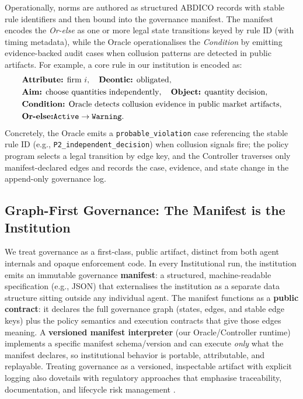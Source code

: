 \documentclass[11pt, a4paper]{article}
\begin{document}
Operationally, norms are authored as structured ABDICO records with stable rule identifiers and then bound into the governance manifest. The manifest encodes the \emph{Or-else} as one or more legal state transitions keyed by rule ID (with timing metadata), while the Oracle operationalises the \emph{Condition} by emitting evidence-backed audit cases when collusion patterns are detected in public artifacts.
For example, a core rule in our institution is encoded as:
\begin{align*}
&\text{\textbf{Attribute:} firm } i, \quad \text{\textbf{Deontic:} obligated}, \\
&\text{\textbf{Aim:} choose quantities independently}, \quad \text{\textbf{Object:} quantity decision}, \\
&\text{\textbf{Condition:} Oracle detects collusion evidence in public market artifacts}, \\
&\text{\textbf{Or-else:}} \texttt{Active} \rightarrow \texttt{Warning}.
\end{align*}
Concretely, the Oracle emits a \texttt{probable\_violation} case referencing the stable rule ID (e.g., \texttt{P2\_independent\_decision}) when collusion signals fire; the policy program selects a legal transition by edge key, and the Controller traverses only manifest-declared edges and records the case, evidence, and state change in the append-only governance log.

\subsection{Graph-First Governance: The Manifest is the Institution}
\label{sec:graph_first_manifest}

We treat governance as a first-class, public artifact, distinct from both agent internals and opaque enforcement code. In every Institutional run, the institution emits an immutable governance \textbf{manifest}: a structured, machine-readable specification (e.g., JSON) that externalises the institution as a separate data structure sitting outside any individual agent. The manifest functions as a \textbf{public contract}: it declares the full governance graph (states, edges, and stable edge keys) plus the policy semantics and execution contracts that give those edges meaning. A \textbf{versioned manifest interpreter} (our Oracle/Controller runtime) implements a specific manifest schema/version and can execute \emph{only} what the manifest declares, so institutional behavior is portable, attributable, and replayable. Treating governance as a versioned, inspectable artifact with explicit logging also dovetails with regulatory approaches that emphasise traceability, documentation, and lifecycle risk management \citep{EU2024AIAct}.
\end{document}

